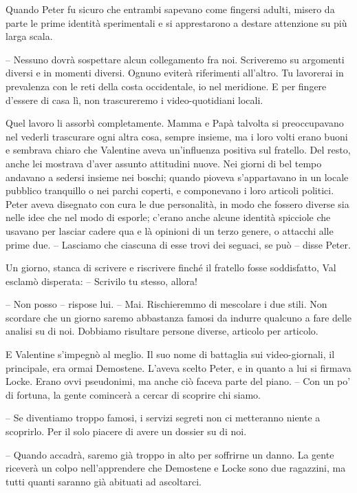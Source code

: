 {Quando Peter fu sicuro che entrambi sapevano come fingersi adulti,
	misero da parte le prime identità sperimentali e si apprestarono a
	destare attenzione su più larga scala.}

{-- Nessuno dovrà sospettare alcun collegamento fra noi. Scriveremo su
	argomenti diversi e in momenti diversi. Ognuno eviterà riferimenti
	all'altro. Tu lavorerai in prevalenza con le reti della costa
	occidentale, io nel meridione. E per fingere d'essere di casa lì, non
	trascureremo i video-quotidiani locali.}

{Quel lavoro li assorbì completamente. Mamma e Papà talvolta si
	preoccupavano nel vederli trascurare ogni altra cosa, sempre insieme, ma
	i loro volti erano buoni e sembrava chiaro che Valentine aveva
	un'influenza positiva sul fratello. Del resto, anche lei mostrava d'aver
	assunto attitudini nuove. Nei giorni di bel tempo andavano a sedersi
	insieme nei boschi; quando pioveva s'appartavano in un locale pubblico
	tranquillo o nei parchi coperti, e componevano i loro articoli politici.
	Peter aveva disegnato con cura le due personalità, in modo che fossero
	diverse sia nelle idee che nel modo di esporle; c'erano anche alcune
	identità spicciole che usavano per lasciar cadere qua e là opinioni di
	un terzo genere, o attacchi alle prime due. -- Lasciamo che ciascuna di
	esse trovi dei seguaci, se può -- disse Peter.}

{Un giorno, stanca di scrivere e riscrivere finché il fratello fosse
	soddisfatto, Val esclamò disperata: -- Scrivilo tu stesso, allora!}

{-- Non posso -- rispose lui. -- Mai. Rischieremmo di mescolare i due
	stili. Non scordare che un giorno saremo abbastanza famosi da indurre
	qualcuno a fare delle analisi su di noi. Dobbiamo risultare persone
	diverse, articolo per articolo.}

{E Valentine s'impegnò al meglio. Il suo nome di battaglia sui
	video-giornali, il principale, era ormai Demostene. L'aveva scelto
	Peter, e in quanto a lui si firmava Locke. Erano ovvi pseudonimi, ma
	anche ciò faceva parte del piano. -- Con un po' di fortuna, la gente
	comincerà a cercar di scoprire chi siamo.}

{-- Se diventiamo troppo famosi, i servizi segreti non ci metteranno
	niente a scoprirlo. Per il solo piacere di avere un dossier su di noi.}

{-- Quando accadrà, saremo già troppo in alto per soffrirne un danno. La
	gente riceverà un colpo nell'apprendere che Demostene e Locke sono due
	ragazzini, ma tutti quanti saranno già abituati ad ascoltarci.}

